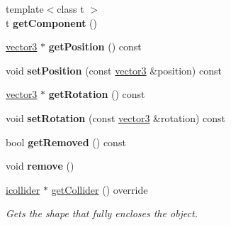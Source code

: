 \begin{DoxyCompactItemize}
\mbox{\label{classflounder_1_1entity_a2481381940b2ac5f90d7287d3075b641}} 
{\footnotesize template$<$class t $>$ }\\t {\bfseries get\+Component} ()
\item 
\mbox{\label{classflounder_1_1entity_ab842d65a56e014a959e380630dd6101f}} 
\hyperlink{classflounder_1_1vector3}{vector3} $\ast$ {\bfseries get\+Position} () const
\item 
\mbox{\label{classflounder_1_1entity_a49ff005d090537ecc5c2076a0efc4edb}} 
void {\bfseries set\+Position} (const \hyperlink{classflounder_1_1vector3}{vector3} \&position) const
\item 
\mbox{\label{classflounder_1_1entity_a8db4d74b48b21f4d7d568d846f2dea9d}} 
\hyperlink{classflounder_1_1vector3}{vector3} $\ast$ {\bfseries get\+Rotation} () const
\item 
\mbox{\label{classflounder_1_1entity_a028a111d308df2a7a358abce958452cb}} 
void {\bfseries set\+Rotation} (const \hyperlink{classflounder_1_1vector3}{vector3} \&rotation) const
\item 
\mbox{\label{classflounder_1_1entity_aa4ea354b1ff487a4d3a7bf760582b0da}} 
bool {\bfseries get\+Removed} () const
\item 
\mbox{\label{classflounder_1_1entity_a07a7f8bc2c53dad4ae43a3ed896000c0}} 
void {\bfseries remove} ()
\item 
\hyperlink{classflounder_1_1icollider}{icollider} $\ast$ \hyperlink{classflounder_1_1entity_a4b68d0d58f2ff338058a2fa0d1a2e413}{get\+Collider} () override
\begin{DoxyCompactList}\small\item\em Gets the shape that fully encloses the object. \end{DoxyCompactList}\end{DoxyCompactItemize}
